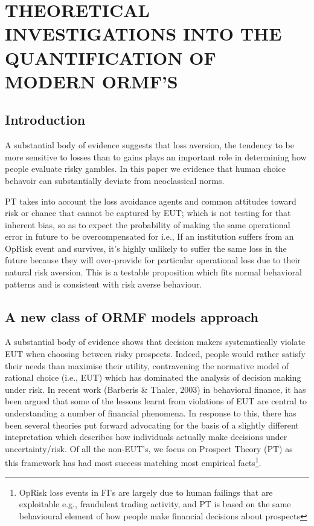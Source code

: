 \documentclass{DissertateUSU}
\begin{document}
\chapter{THEORETICAL INVESTIGATIONS INTO THE QUANTIFICATION OF MODERN ORMF'S}

\doublespacing

\section{Introduction}
\label{sec:IntroductionChapter5}

A substantial body of evidence suggests that loss aversion, the tendency
to be more sensitive to losses than to gains plays an important role in
determining how people evaluate risky gambles. In this paper we evidence
that human choice behavoir can substantially deviate from neoclassical
norms.\medskip

PT takes into account the loss avoidance agents and common attitudes
toward risk or chance that cannot be captured by EUT; which is not
testing for that inherent bias, so as to expect the probability of
making the same operational error in future to be overcompensated for
i.e., If an institution suffers from an OpRisk event and survives, it's
highly unlikely to suffer the same loss in the future because they will
over-provide for particular operational loss due to their natural risk
aversion. This is a testable proposition which fits normal behavioral
patterns and is consistent with risk averse behaviour.

\section{A new class of ORMF models approach}
\label{sec:A new class of ORMF models approach}

A substantial body of evidence shows that decision makers systematically
violate EUT when choosing between risky prospects. Indeed, people would
rather satisfy their needs than maximise their utility, contravening the
normative model of rational choice (i.e., EUT) which has dominated the
analysis of decision making under risk. In recent work (Barberis \&
Thaler, 2003) in behavioral finance, it has been argued that some of the
lessons learnt from violations of EUT are central to understanding a
number of financial phenomena. In response to this, there has been
several theories put forward advocating for the basis of a slightly
different intepretation which describes how individuals actually make
decisions under uncertainty/risk. Of all the non-EUT's, we focus on
Prospect Theory (PT) as this framework has had most success matching
most empirical
facts\footnote{OpRisk loss events in FI's are largely due to human failings that are exploitable e.g., fraudulent trading activity, and PT is based on the same behavioural element of how people make financial decisions about prospects}.\medskip 
\end{document}
